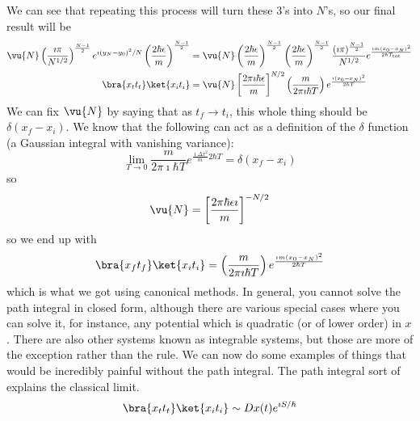 \documentclass[a4paper,twoside,master.tex]{subfiles}
\begin{document}
We can see that repeating this process will turn these $ 3 $'s into $ N $'s, so our final result will be
\begin{align}
    \vu{N} \left( \frac{\imath \pi}{N^{1/2}} \right)^{\frac{N-1}{2}} e^{\imath (y_N - y_0)^2 / N} \left( \frac{2 \hbar \epsilon}{m} \right)^{\frac{N-1}{2}} &= \vu{N} \left( \frac{2 \hbar \epsilon}{m} \right)^{\frac{N-1}{2}} \left( \frac{2 \hbar \epsilon}{m} \right)^{\frac{N-1}{2}} \frac{(\imath \pi)^{\frac{N-1}{2}}}{N^{1/2}} e^{\frac{\imath m (x_0 - x_N)^2}{2 \hbar T_{\text{tot}}}} \\
    \bra{x_t t_t}\ket{x_i t_i} &= \vu{N} \left[ \frac{2 \pi \imath \hbar \epsilon}{m} \right]^{N/2} \left( \frac{m}{2 \pi \imath \hbar T} \right) e^{\frac{\imath (x_0 - x_N)^2}{2 \hbar T}}
\end{align}
We can fix $ \vu{N} $ by saying that as $ t_f \to t_i $, this whole thing should be $ \delta(x_f - x_i) $. We know that the following can act as a definition of the $\delta$ function (a Gaussian integral with vanishing variance):
\begin{equation}
    \lim_{T \to 0} \frac{m}{2 \pi \imath \hbar T} e^{\frac{\imath \Delta x^2}{m} 2 \hbar T} = \delta(x_f - x_i)
\end{equation}
so
\begin{equation}
    \vu{N} = \left[ \frac{2 \pi \hbar \epsilon \imath}{m} \right]^{- N / 2}
\end{equation}
so we end up with
\begin{equation}
    \bra{x_f t_f}\ket{x_i t_i} = \left( \frac{m}{2 \pi \imath \hbar T} \right) e^{\frac{\imath m (x_0 - x_N)^2}{2 \hbar T}}
\end{equation}
which is what we got using canonical methods. In general, you cannot solve the path integral in closed form, although there are various special cases where you can solve it, for instance, any potential which is quadratic (or of lower order) in $ x $. There are also other systems known as integrable systems, but those are more of the exception rather than the rule. We can now do some examples of things that would be incredibly painful without the path integral. The path integral sort of explains the classical limit.
\begin{equation}
    \bra{x_t t_t}\ket{x_i t_i} \sim Dx(t) e^{\imath S / \hbar}
\end{equation}
\end{document}
